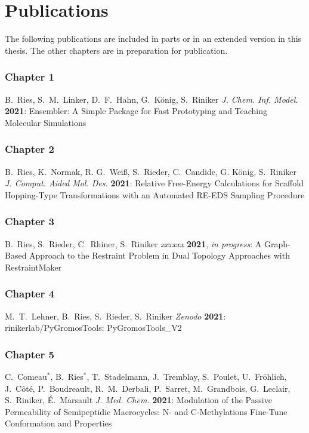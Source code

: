 \chapter{Publications}

The following publications are included in parts or in an extended version in this
thesis. The other chapters are in preparation for publication.

\subsection*{Chapter 1}

B.\ Ries, S.\ M.\ Linker, D.\ F.\ Hahn, G.\ K\"onig, S.\ Riniker {\em J. Chem. Inf. Model.} {\bf 2021}: 
Ensembler: A Simple Package for Fast Prototyping and Teaching Molecular Simulations


\subsection*{Chapter 2}

B.\ Ries, K.\ Normak, R. G.\ Wei\ss, S.\ Rieder, C.\ Candide, G. K\"onig, S.\ Riniker {\em J. Comput. Aided Mol. Des.} {\bf 2021}: 
Relative Free-Energy Calculations for Scaffold Hopping-Type Transformations with an Automated RE-EDS Sampling Procedure

\subsection*{Chapter 3}

B.\ Ries, S.\ Rieder, C.\ Rhiner, S.\ Riniker {\em xxxxxx} {\bf 2021}, {\em in progress}:
A Graph-Based Approach to the Restraint Problem in Dual Topology Approaches with RestraintMaker

\subsection*{Chapter 4}

M.\ T.\ Lehner, B.\ Ries, S.\ Rieder, S.\ Riniker {\em Zenodo} {\bf 2021}: rinikerlab/PyGromosTools: PyGromosTools\_V2

\subsection*{Chapter 5}

C.\ Comeau$^*$, B.\ Ries$^*$, T.\ Stadelmann, J.\ Tremblay, S.\ Poulet, U.\ Fröhlich, J.\ Côté, P.\ Boudreault, R.\ M.\ Derbali, P.\ Sarret, M.\ Grandbois, G.\ Leclair, S.\ Riniker, É.\ Marsault {\em J. Med. Chem.} {\bf 2021}:
Modulation of the Passive Permeability of Semipeptidic Macrocycles: N- and C-Methylations Fine-Tune Conformation and Properties




